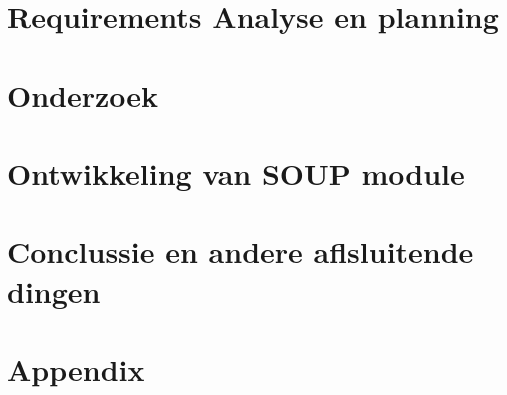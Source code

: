 \part{Requirements Analyse en planning}




\ctparttext{}
\part{Onderzoek} %






\ctparttext{}
\part{Ontwikkeling van SOUP module}








\ctparttext{}
\part{Conclussie en andere aflsluitende dingen}



\cleardoublepage %


\ctparttext{}


\cleardoublepage %


\appendix

\part{Appendix} %



